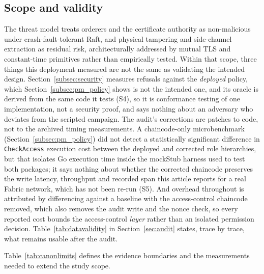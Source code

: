 \documentclass[a4paper,fleqn]{cas-sc}
\begin{document}
\subsection{Scope and validity}
\label{subsec:notvalidated}
\label{subsec:limits}
\label{subsec:threats}

The threat model treats orderers and the certificate authority as
non-malicious under crash-fault-tolerant Raft, and physical tampering and
side-channel extraction as residual risk, architecturally addressed by
mutual TLS and constant-time primitives rather than empirically tested.
Within that scope, three things this deployment measured are not the same
as validating the intended design. Section~\ref{subsec:security} measures
refusals against the \emph{deployed} policy, which
Section~\ref{subsec:pm_policy} shows is not the intended one, and its
oracle is derived from the same code it tests (S4), so it is conformance
testing of one implementation, not a security proof, and says nothing
about an adversary who deviates from the scripted campaign. The
audit's corrections are patches to code, not to the archived timing
measurements. A chaincode-only microbenchmark (Section~\ref{subsec:pm_policy})
did not detect a statistically significant difference in \texttt{CheckAccess} execution cost between the deployed and corrected role hierarchies, but that isolates Go
execution time inside the mockStub harness used to test both packages; it
says nothing about whether the corrected chaincode preserves the write
latency, throughput and recorded span this article reports for a real
Fabric network, which has not been re-run (S5). And overhead throughout is
attributed by differencing against a
baseline with the access-control chaincode removed, which also removes the
audit write and the nonce check, so every reported cost bounds the
access-control \emph{layer} rather than an isolated permission decision.
Table~\ref{tab:datavalidity} in Section~\ref{sec:audit} states, trace
by trace, what remains usable after the audit.

Table~\ref{tab:canonlimits} defines the evidence boundaries and the
measurements needed to extend the study scope.
\end{document}
